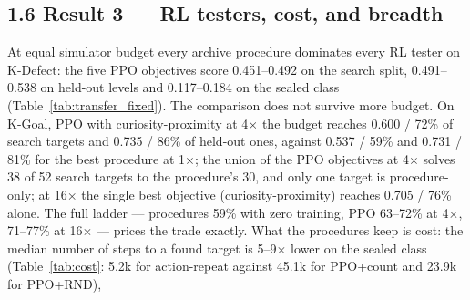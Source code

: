 \subsection*{1.6 Result 3 --- RL testers, cost, and breadth}\label{sec:breadth}


At equal simulator budget every archive procedure dominates every RL tester on K-Defect: the five PPO objectives score 0.451--0.492 on the
search split, 0.491--0.538 on held-out levels and 0.117--0.184 on the sealed class (Table~\ref{tab:transfer_fixed}). The comparison does not survive
more budget. On K-Goal, PPO with curiosity-proximity at 4$\times$ the budget reaches 0.600 / 72\% of search targets and 0.735 / 86\% of held-out
ones, against 0.537 / 59\% and 0.731 / 81\% for the best procedure at 1$\times$; the union of the PPO objectives at 4$\times$ solves 38 of 52 search
targets to the procedure's 30, and only one target is procedure-only; at 16$\times$ the single best objective (curiosity-proximity) reaches 0.705 / 76\% alone. The full ladder --- procedures 59\% with zero training, PPO 63--72\% at 4$\times$, 71--77\% at 16$\times$ --- prices the trade exactly. What the procedures keep is cost: the median number of steps to a found
target is 5--9$\times$ lower on the sealed class (Table~\ref{tab:cost}: 5.2k for action-repeat against 45.1k for PPO+count and 23.9k for PPO+RND),
